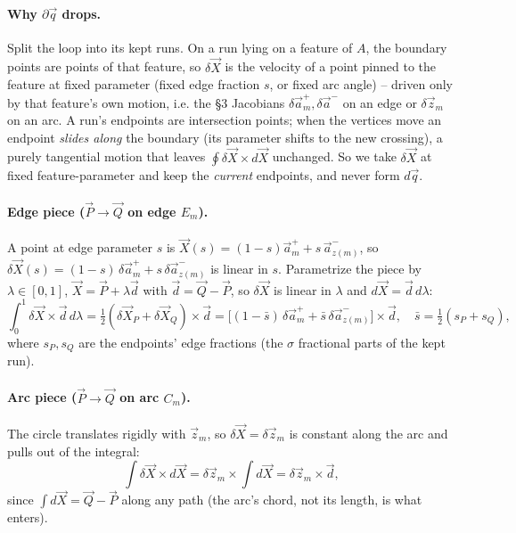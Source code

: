 \documentclass[11pt]{article}
\newcommand{\vv}[1]{\vec{#1}}
\newcommand{\half}{\tfrac{1}{2}}
\begin{document}
\paragraph{Why $\partial\vv q$ drops.} Split the loop into its kept runs. On a run lying on a
feature of $A$, the boundary points are points of that feature, so $\delta\vv X$ is the velocity of
a point pinned to the feature at fixed parameter (fixed edge fraction $s$, or fixed arc angle) --
driven only by that feature's own motion, i.e. the \S3 Jacobians $\delta\vv a^{+}_m,\delta\vv a^{-}$
on an edge or $\delta\vv z_m$ on an arc. A run's endpoints are intersection points; when the
vertices move an endpoint \emph{slides along} the boundary (its parameter shifts to the new
crossing), a purely tangential motion that leaves $\oint\delta\vv X\times d\vv X$ unchanged. So we
take $\delta\vv X$ at fixed feature-parameter and keep the \emph{current} endpoints, and never form
$d\vv q$.

\paragraph{Edge piece ($\vv P\to\vv Q$ on edge $E_m$).} A point at edge parameter $s$ is $\vv
X(s)=(1-s)\vv a^{+}_m+s\,\vv a^{-}_{z(m)}$, so $\delta\vv X(s)=(1-s)\,\delta\vv a^{+}_m+s\,\delta\vv
a^{-}_{z(m)}$ is linear in $s$. Parametrize the piece by $\lambda\in[0,1]$, $\vv X=\vv P+\lambda\vv
d$ with $\vv d=\vv Q-\vv P$, so $\delta\vv X$ is linear in $\lambda$ and $d\vv X=\vv d\,d\lambda$:
\[
  \int_0^1\delta\vv X\times\vv d\,d\lambda=\half(\delta\vv X_P+\delta\vv X_Q)\times\vv d
  =\big[(1-\bar s)\,\delta\vv a^{+}_m+\bar s\,\delta\vv a^{-}_{z(m)}\big]\times\vv d,\quad
  \bar s=\half(s_P+s_Q),
\]
where $s_P,s_Q$ are the endpoints' edge fractions (the $\sigma$ fractional parts of the kept run).

\paragraph{Arc piece ($\vv P\to\vv Q$ on arc $C_m$).} The circle translates rigidly with $\vv z_m$,
so $\delta\vv X=\delta\vv z_m$ is constant along the arc and pulls out of the integral:
\[
  \int\delta\vv X\times d\vv X=\delta\vv z_m\times\!\int d\vv X=\delta\vv z_m\times\vv d,
\]
since $\int d\vv X=\vv Q-\vv P$ along any path (the arc's chord, not its length, is what enters).
\end{document}
